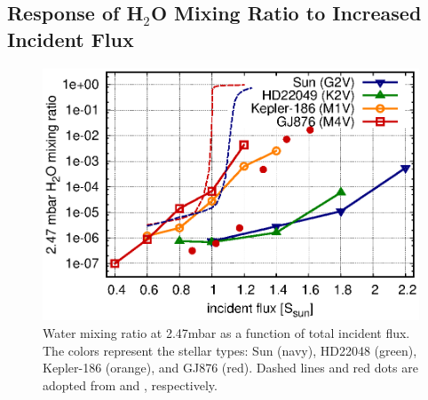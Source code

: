 \documentclass[11pt,numberedappendix,twocolappendix,]{emulateapj}
\def\water{H$_2$O }
\def\preslevel{2.47}
\begin{document}
\subsection{Response of \water Mixing Ratio to Increased Incident Flux}
\label{ss:result_H2Omixingratio}


\begin{figure}[!h]
    \begin{center}
    \includegraphics[width=\hsize]{fig/AqOH0TLS_xH2O_3mbar_all.eps}
    \end{center}
\caption{Water mixing ratio at \preslevel mbar as a function of total incident flux. The colors represent the stellar types: Sun (navy), HD22048 (green), Kepler-186 (orange), and GJ876 (red). Dashed lines and red dots are adopted from \citet{Kasting1993} and \citet{Wordsworth2013}, respectively.}                                                                                                             
\label{fig:xH2O_S0X}
\end{figure}
\end{document}
